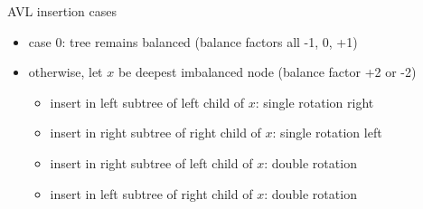 \begin{frame}{AVL insertion cases}
\begin{itemize}
    \item case 0: tree remains balanced (balance factors all -1, 0, +1)
    \item otherwise, let $x$ be deepest imbalanced node (balance factor +2 or -2)
    \begin{itemize}
    \item insert in left subtree of left child of $x$: single rotation right
    \item insert in right subtree of right child of $x$: single rotation left
    \item insert in right subtree of left child of $x$: double rotation
    \item insert in left subtree of right child of $x$: double rotation
    \end{itemize}
\end{itemize}
\end{frame}
